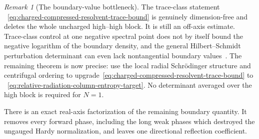 \documentclass[11pt]{article}
\theoremstyle{definition}
\theoremstyle{remark}
\newtheorem{remark}[theorem]{Remark}
\begin{document}
\begin{remark}[The boundary-value bottleneck]
The trace-class statement
~\eqref{eq:charged-compressed-resolvent-trace-bound} is genuinely
dimension-free and deletes the whole uncharged high--high block.  It is still
an off-axis estimate.  Trace-class control at one negative spectral point does
not by itself bound the negative logarithm of the boundary density, and the
general Hilbert--Schmidt perturbation determinant can even lack
nontangential boundary values~\cite{GPS2007}.  The remaining theorem is now
precise: use the local radial Schr\"odinger structure and centrifugal ordering
to upgrade~\eqref{eq:charged-compressed-resolvent-trace-bound} to
~\eqref{eq:relative-radiation-column-entropy-target}.  No determinant averaged
over the high block is required for $N=1$.
\end{remark}

There is an exact real-axis factorization of the remaining boundary quantity.
It removes every forward phase, including the long weak phases which destroyed
the ungauged Hardy normalization, and leaves one directional reflection
coefficient.
\end{document}
